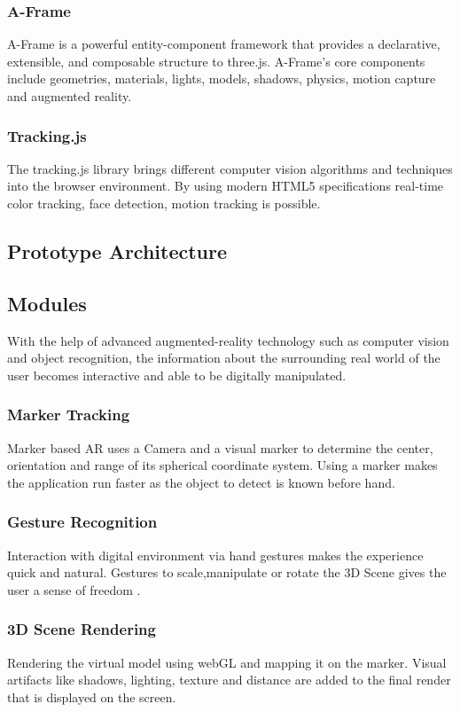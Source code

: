 \documentclass[conference]{IEEEtran}
\begin{document}
\subsubsection{A-Frame} A-Frame is a powerful entity-component framework that provides a declarative, extensible, and composable structure to three.js.
A-Frame’s core components include geometries, materials, lights, models, shadows, physics, motion capture and augmented reality.
\subsubsection{Tracking.js} The tracking.js library brings different computer vision algorithms and techniques into the browser environment. By using modern HTML5 specifications real-time color tracking, face detection, motion tracking is possible.
\subsection{Prototype Architecture}

\subsection{Modules}
With the help of advanced augmented-reality technology such as computer vision and object recognition, the information about the surrounding real world of the user becomes interactive and able to be digitally manipulated. 
\subsubsection{Marker Tracking}
Marker based AR uses a Camera and a visual marker to determine the center, orientation and range of its spherical coordinate system. Using a marker makes the application run faster as the object to detect is known before hand.
\subsubsection{Gesture Recognition}
Interaction with digital environment via hand gestures makes the experience quick and natural. Gestures to scale,manipulate or rotate the 3D Scene gives the user a sense of freedom .
\subsubsection{3D Scene Rendering}
Rendering the virtual model using webGL and mapping it on the marker. Visual artifacts like shadows, lighting, texture and distance are added to the final render that is displayed on the screen.
\end{document}
